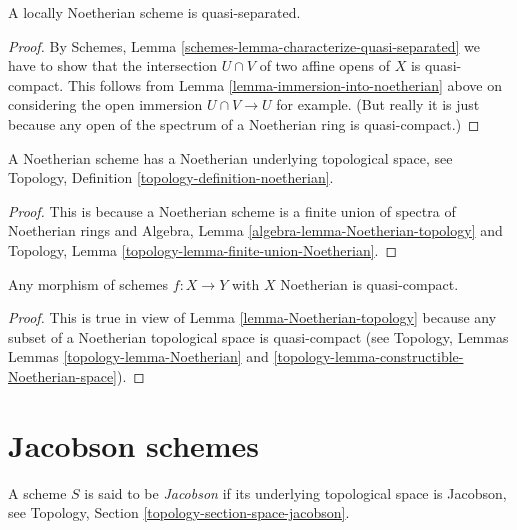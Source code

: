 \begin{lemma}
\label{lemma-locally-Noetherian-quasi-separated}
A locally Noetherian scheme is quasi-separated.
\end{lemma}

\begin{proof}
By Schemes, Lemma \ref{schemes-lemma-characterize-quasi-separated}
we have to show that the intersection $U \cap V$ of two
affine opens of $X$ is quasi-compact. This follows from
Lemma \ref{lemma-immersion-into-noetherian} above on
considering the open immersion $U \cap V \to U$ for example.
(But really it is just because any open of the spectrum of a
Noetherian ring is quasi-compact.)
\end{proof}

\begin{lemma}
\label{lemma-Noetherian-topology}
A Noetherian scheme has a Noetherian underlying topological space,
see Topology, Definition \ref{topology-definition-noetherian}.
\end{lemma}

\begin{proof}
This is because a Noetherian scheme is a finite union of spectra
of Noetherian rings and
Algebra, Lemma \ref{algebra-lemma-Noetherian-topology} and
Topology, Lemma \ref{topology-lemma-finite-union-Noetherian}.
\end{proof}

\begin{lemma}
\label{lemma-morphism-Noetherian-schemes-quasi-compact}
Any morphism of schemes $f : X \to Y$ with $X$ Noetherian
is quasi-compact.
\end{lemma}

\begin{proof}
This is true in view of Lemma \ref{lemma-Noetherian-topology}
because any subset of a Noetherian topological
space is quasi-compact (see Topology, Lemmas
Lemmas \ref{topology-lemma-Noetherian} and
\ref{topology-lemma-constructible-Noetherian-space}).
\end{proof}






\section{Jacobson schemes}
\label{section-jacobson}

\begin{definition}
\label{definition-jacobson}
A scheme $S$ is said to be {\it Jacobson} if its underlying topological
space is Jacobson, see Topology, Section \ref{topology-section-space-jacobson}.
\end{definition}

